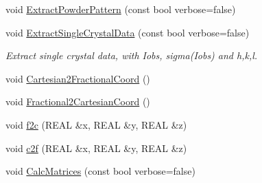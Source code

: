 \begin{DoxyCompactItemize}
void \mbox{\hyperlink{class_obj_cryst_1_1_c_i_f_data_a10ae5869370e46547334730a1daabe5e}{Extract\+Powder\+Pattern}} (const bool verbose=false)
\item 
void \mbox{\hyperlink{class_obj_cryst_1_1_c_i_f_data_aafcf8bbd95432172cca533d4a713729e}{Extract\+Single\+Crystal\+Data}} (const bool verbose=false)
\begin{DoxyCompactList}\small\item\em Extract single crystal data, with Iobs, sigma(\+Iobs) and h,k,l. \end{DoxyCompactList}\item 
void \mbox{\hyperlink{class_obj_cryst_1_1_c_i_f_data_abe437ee4b2bbda8bf7a2861f9207a8ee}{Cartesian2\+Fractional\+Coord}} ()
\item 
void \mbox{\hyperlink{class_obj_cryst_1_1_c_i_f_data_a8217fa94ba5f6291b566d43123162d9c}{Fractional2\+Cartesian\+Coord}} ()
\item 
void \mbox{\hyperlink{class_obj_cryst_1_1_c_i_f_data_ab90f52bca82121f6ddc5efdddf5ac7bc}{f2c}} (R\+E\+AL \&x, R\+E\+AL \&y, R\+E\+AL \&z)
\item 
void \mbox{\hyperlink{class_obj_cryst_1_1_c_i_f_data_a8b83f52c41137c83fdfd6c75d9d83888}{c2f}} (R\+E\+AL \&x, R\+E\+AL \&y, R\+E\+AL \&z)
\item 
void \mbox{\hyperlink{class_obj_cryst_1_1_c_i_f_data_a51e099b2881e73eb776855177aed4ca9}{Calc\+Matrices}} (const bool verbose=false)
\end{DoxyCompactItemize}
